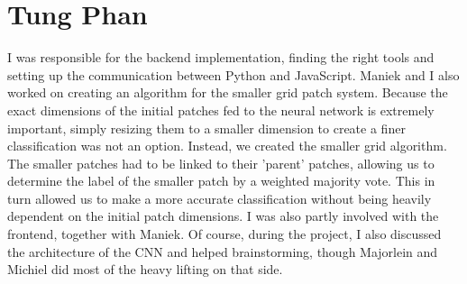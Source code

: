 \documentclass[a4paper,onecolumn]{report}
\begin{document}
\section{Tung Phan}
I was responsible for the backend implementation, finding the right tools and setting up the communication between Python and JavaScript. Maniek and I also worked on creating an algorithm for the smaller grid patch system. Because the exact dimensions of the initial patches fed to the neural network is extremely important, simply resizing them to a smaller dimension to create a finer classification was not an option. Instead, we created the smaller grid algorithm. The smaller patches had to be linked to their 'parent' patches, allowing us to determine the label of the smaller patch by a weighted majority vote. This in turn allowed us to make a more accurate classification without being heavily dependent on the initial patch dimensions. I was also partly involved with the frontend, together with Maniek. Of course, during the project, I also discussed the architecture of the CNN and helped brainstorming, though Majorlein and Michiel did most of the heavy lifting on that side.


{}

\end{document}
